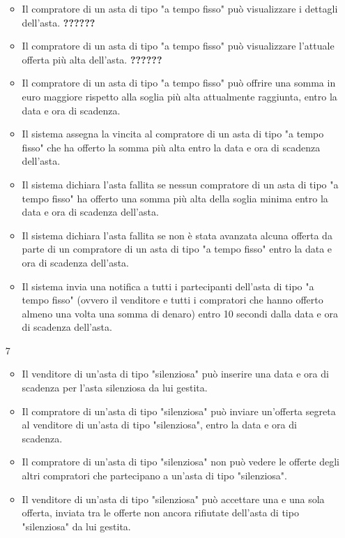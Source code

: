 \begin{itemize}
\begin{itemize}
                    \item Il compratore di un asta di tipo "a tempo fisso" può visualizzare i dettagli dell'asta. \textbf{??????}
                    \item Il compratore di un asta di tipo "a tempo fisso" può visualizzare l'attuale offerta più alta dell'asta. \textbf{??????}
                    \item Il compratore di un asta di tipo "a tempo fisso" può offrire una somma in euro maggiore rispetto alla soglia più alta attualmente raggiunta, entro la data e ora di scadenza.
                    \item Il sistema assegna la vincita al compratore di un asta di tipo "a tempo fisso" che ha offerto la somma più alta entro la data e ora di scadenza dell'asta.
                    \item Il sistema dichiara l'asta fallita se nessun compratore di un asta di tipo "a tempo fisso" ha offerto una somma più alta della soglia minima entro la data e ora di scadenza dell'asta.
                    \item Il sistema dichiara l'asta fallita se non è stata avanzata alcuna offerta da parte di un compratore di un asta di tipo "a tempo fisso" entro la data e ora di scadenza dell'asta.
                    \item Il sistema invia una notifica a tutti i partecipanti dell'asta di tipo "a tempo fisso" (ovvero il venditore e tutti i compratori che hanno offerto almeno una volta una somma di denaro) entro 10 secondi dalla data e ora di scadenza dell'asta.
                \end{itemize}
            \item[7] 
                \begin{itemize}
                    \item Il venditore di un'asta di tipo "silenziosa" può inserire una data e ora di scadenza per l'asta silenziosa da lui gestita.
                    \item Il compratore di un'asta di tipo "silenziosa" può inviare un'offerta segreta al venditore di un'asta di tipo "silenziosa", entro la data e ora di scadenza.
                    \item Il compratore di un'asta di tipo "silenziosa" non può vedere le offerte degli altri compratori che partecipano a un'asta di tipo "silenziosa".
                    \item Il venditore di un'asta di tipo "silenziosa" può accettare una e una sola offerta, inviata tra le offerte non ancora rifiutate dell'asta di tipo "silenziosa" da lui gestita.

\end{itemize}
\end{itemize}
